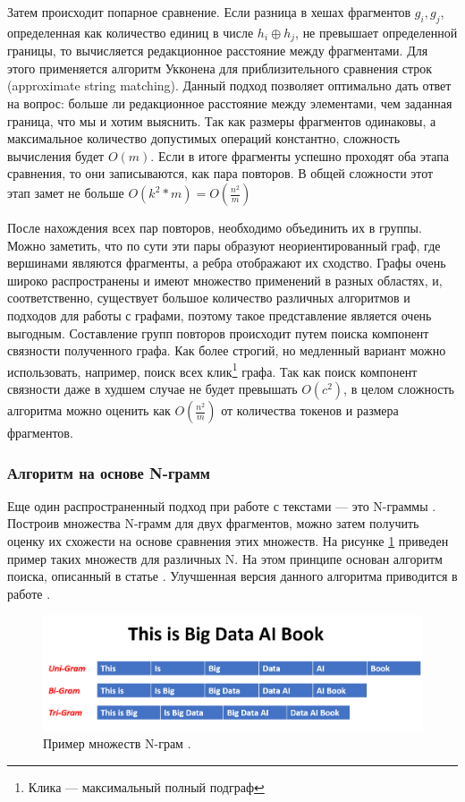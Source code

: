 \documentclass[14pt]{matmex-diploma-custom}
\begin{document}
Затем происходит попарное сравнение. Если разница в хешах фрагментов $g_i, g_j$, определенная как количество единиц в числе $h_i \oplus h_j$, не превышает определенной границы, то вычисляется редакционное расстояние между фрагментами. Для этого применяется алгоритм Укконена \cite{bib:art:UkkonenASM} для приблизительного сравнения строк (approximate string matching). Данный подход позволяет оптимально дать ответ на вопрос: больше ли редакционное расстояние между элементами, чем заданная граница, что мы и хотим выяснить. Так как размеры фрагментов одинаковы, а максимальное количество допустимых операций константно, сложность вычисления будет $O(m)$. Если в итоге фрагменты успешно проходят оба этапа сравнения, то они записываются, как пара повторов. В общей сложности этот этап замет не больше $O(k^2 * m) = O(\frac{n^2}{m})$

После нахождения всех пар повторов, необходимо объединить их в группы. Можно заметить, что по сути эти пары образуют неориентированный граф, где вершинами являются фрагменты, а ребра отображают их сходство. Графы очень широко распространены и имеют множество применений в разных областях, и, соответственно, существует большое количество различных алгоритмов и подходов для работы с графами, поэтому такое представление является очень выгодным. Составление групп повторов происходит путем поиска компонент связности полученного графа. Как более строгий, но медленный вариант можно использовать, например, поиск всех клик\footnote{Клика --- максимальный полный подграф} графа. Так как поиск компонент связности даже в худшем случае не будет превышать $O(c^2)$, в целом сложность алгоритма можно оценить как $O(\frac{n^2}{m})$ от количества токенов и размера фрагментов.

\subsubsection{Алгоритм на основе N-грамм}

Еще один распространенный подход при работе с текстами --- это N-граммы \cite{bib:art:Ngram}. Построив множества N-грамм для двух фрагментов, можно затем получить оценку их схожести на основе сравнения этих множеств. На рисунке \ref{fig:Ngram} приведен пример таких множеств для различных N. На этом принципе основан алгоритм поиска, описанный в статье \cite{bib:tool:NgramSearch}. Улучшенная версия данного алгоритма приводится в работе \cite{bib:tool:ImprovedNgramSearch}.

\begin{figure}[h!]
	\includegraphics[scale=0.37]{pictures/Ngram.png}
	\centering
	\caption{Пример множеств N-грам \cite{bib:fig:Ngram}.}
	\label{fig:Ngram}
\end{figure}
\end{document}

